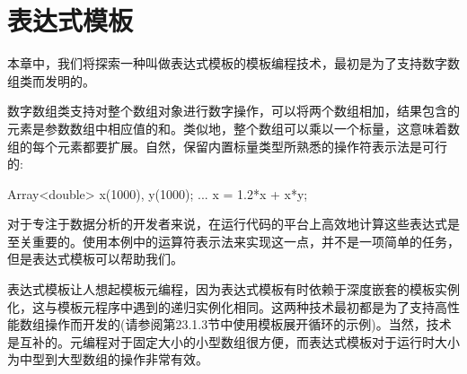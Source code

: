 \chapter{表达式模板}
本章中，我们将探索一种叫做表达式模板的模板编程技术，最初是为了支持数字数组类而发明的。

数字数组类支持对整个数组对象进行数字操作，可以将两个数组相加，结果包含的元素是参数数组中相应值的和。类似地，整个数组可以乘以一个标量，这意味着数组的每个元素都要扩展。自然，保留内置标量类型所熟悉的操作符表示法是可行的:

\begin{cpp}
Array<double> x(1000), y(1000);
...
x = 1.2*x + x*y;
\end{cpp}

对于专注于数据分析的开发者来说，在运行代码的平台上高效地计算这些表达式是至关重要的。使用本例中的运算符表示法来实现这一点，并不是一项简单的任务，但是表达式模板可以帮助我们。

表达式模板让人想起模板元编程，因为表达式模板有时依赖于深度嵌套的模板实例化，这与模板元程序中遇到的递归实例化相同。这两种技术最初都是为了支持高性能数组操作而开发的(请参阅第23.1.3节中使用模板展开循环的示例)。当然，技术是互补的。元编程对于固定大小的小型数组很方便，而表达式模板对于运行时大小为中型到大型数组的操作非常有效。













































